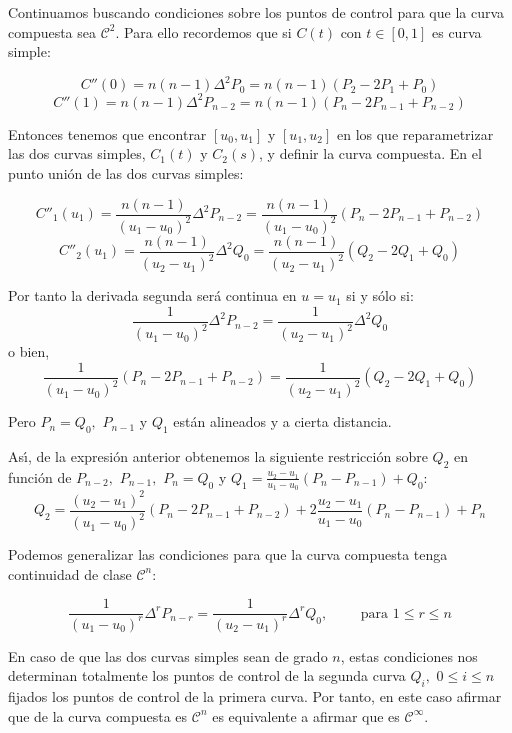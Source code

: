 \documentclass[ebook,oneside]{memoir}
\begin{document}
%
%
Continuamos buscando condiciones sobre los puntos de control para que la curva compuesta  sea ${\mathcal  C}^2$. Para ello recordemos que si $C(t)$ con $t\in[0,1]$ es curva simple:

$$C''(0)=n(n-1)\Delta^2P_0=n (n-1) (P_2-2P_1+P_0)$$
$$C''(1)=n(n-1)\Delta^2P_{n-2}=n (n-1) (P_n-2P_{n-1}+P_{n-2})$$

Entonces tenemos que encontrar $[u_0,u_1]$ y $[u_1,u_2]$ en los que reparametrizar las dos curvas simples, $C_1(t)$ y $C_2(s)$, y definir la curva compuesta. En el punto uni\'{o}n de las dos curvas simples:

$$C''_1(u_1)=\frac{n(n-1)}{(u_1-u_0)^2}\Delta^2P_{n-2}=\frac{n(n-1)}{(u_1-u_0)^2}(P_n-2P_{n-1}+P_{n-2})$$
$$C''_2(u_1)=\frac{n(n-1)}{(u_2-u_1)^2}\Delta^2Q_0=\frac{n(n-1)}{(u_2-u_1)^2}(Q_2-2Q_1+Q_0)$$

Por tanto la derivada segunda ser\'{a} continua en $u=u_1$ si y s\'{o}lo si:
$$\frac{1}{(u_1-u_0)^2}\Delta^2P_{n-2}=\frac{1}{(u_2-u_1)^2}\Delta^2Q_0$$
o bien,
$$\frac{1}{(u_1-u_0)^2}(P_n-2P_{n-1}+P_{n-2})=\frac{1}{(u_2-u_1)^2}(Q_2-2Q_1+Q_0)$$

Pero $P_n=Q_0,$ $P_{n-1}$ y $Q_1$ est\'{a}n alineados y a cierta distancia.

\vspace{0.2cm}

As\'{\i}, de la expresi\'{o}n anterior obtenemos la siguiente restricci\'{o}n sobre $Q_2$ en funci\'{o}n de  $P_{n-2},$ $P_{n-1},$ $P_n=Q_0$ y $\displaystyle Q_1=\frac{u_2-u_1}{u_1-u_0}(P_n-P_{n-1})+Q_0$:
$$Q_2=\frac{(u_2-u_1)^2}{(u_1-u_0)^2}(P_n-2P_{n-1}+P_{n-2})+2\frac{u_2-u_1}{u_1-u_0}(P_n-P_{n-1})+P_n$$


Podemos generalizar las condiciones para que la curva compuesta tenga continuidad de clase ${\mathcal  C}^n:$

$$\frac{1}{(u_1-u_0)^r}\Delta^rP_{n-r}=\frac{1}{(u_2-u_1)^r}\Delta^r Q_0, \quad \quad \mbox{ para } 1\leq r\leq n$$

En caso de que las dos curvas simples sean de grado $n$, estas condiciones nos determinan totalmente los puntos de control de la segunda curva $Q_i,$ \quad $0\leq i\leq n$ fijados los puntos de control de la primera curva. Por tanto, en este caso afirmar que de la curva compuesta es ${\mathcal  C}^n$ es equivalente a afirmar que es ${\mathcal  C}^{\infty}.$
\end{document}

